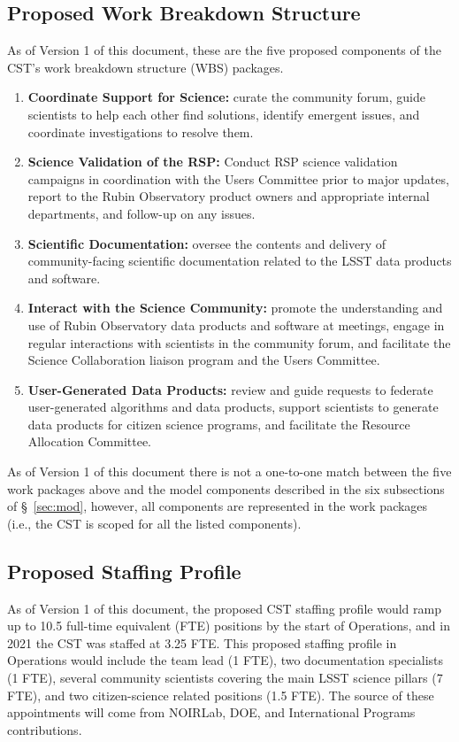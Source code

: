 \documentclass[DM,authoryear,toc]{lsstdoc}
\begin{document}
\subsection{Proposed Work Breakdown Structure}\label{ssec:comp_wbs}

As of Version 1 of this document, these are the five proposed components of the CST's work breakdown structure (WBS) packages.

\begin{enumerate}
\item \textbf{Coordinate Support for Science:} curate the community forum, guide scientists to help each other find solutions, identify emergent issues, and coordinate investigations to resolve them.
\item \textbf{Science Validation of the RSP:} Conduct RSP science validation campaigns in coordination with the Users Committee prior to major updates, report to the Rubin Observatory product owners and appropriate internal departments, and follow-up on any issues.
\item \textbf{Scientific Documentation:} oversee the contents and delivery of community-facing scientific documentation related to the LSST data products and software. 
\item \textbf{Interact with the Science Community:} promote the understanding and use of Rubin Observatory data products and software at meetings, engage in regular interactions with scientists in the community forum, and facilitate the Science Collaboration liaison program and the Users Committee.
\item \textbf{User-Generated Data Products:} review and guide requests to federate user-generated algorithms and data products, support scientists to generate data products for citizen science programs, and facilitate the Resource Allocation Committee.
\end{enumerate}

As of Version 1 of this document there is not a one-to-one match between the five work packages above and the model components described in the six subsections of \S~\ref{sec:mod}, however, all components are represented in the work packages (i.e., the CST is scoped for all the listed components).


\subsection{Proposed Staffing Profile}\label{ssec:comp_staff}

As of Version 1 of this document, the proposed CST staffing profile would ramp up to 10.5 full-time equivalent (FTE) positions by the start of Operations, and in 2021 the CST was staffed at 3.25 FTE. 
This proposed staffing profile in Operations would include the team lead (1 FTE), two documentation specialists (1 FTE), several community scientists covering the main LSST science pillars (7 FTE), and two citizen-science related positions (1.5 FTE). 
The source of these appointments will come from NOIRLab, DOE, and International Programs contributions.
\end{document}
